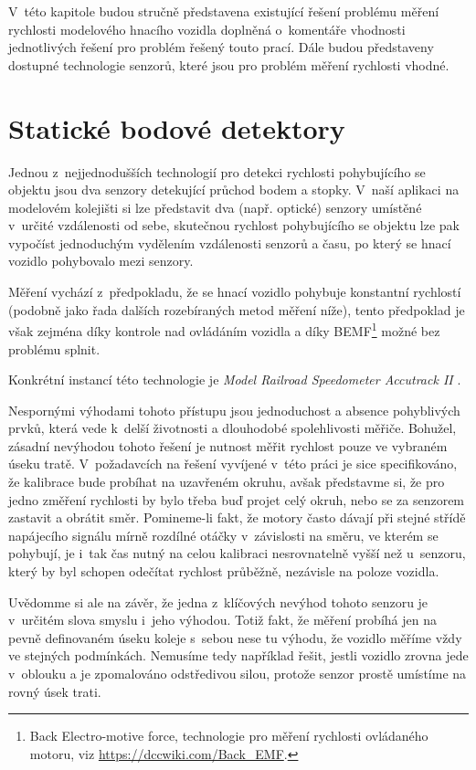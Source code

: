 V~této kapitole budou stručně představena existující řešení problému měření
rychlosti modelového hnacího vozidla doplněná o~komentáře vhodnosti
jednotlivých řešení pro problém řešený touto prací. Dále budou představeny
dostupné technologie senzorů, které jsou pro problém měření rychlosti vhodné.

\section{Statické bodové detektory}

Jednou z~nejjednodušších technologií pro detekci rychlosti pohybujícího se
objektu jsou dva senzory detekující průchod bodem a stopky. V~naší aplikaci na
modelovém kolejišti si lze představit dva (např. optické) senzory umístěné
v~určité vzdálenosti od sebe, skutečnou rychlost pohybujícího se objektu lze
pak vypočíst jednoduchým vydělením vzdálenosti senzorů a času, po který se
hnací vozidlo pohybovalo mezi senzory.

Měření vychází z~předpokladu, že se hnací vozidlo pohybuje konstantní
rychlostí (podobně jako řada dalších rozebíraných metod měření níže), tento
předpoklad je však zejména díky kontrole nad ovládáním vozidla a díky
BEMF\footnote{Back Electro-motive force, technologie pro měření rychlosti
ovládaného motoru, viz \url{https://dccwiki.com/Back\_EMF}.}
možné bez problému splnit.

Konkrétní instancí této technologie je \textit{Model Railroad
Speedometer Accutrack II} \cite{accutrackII}.

Nespornými výhodami tohoto přístupu jsou jednoduchost a absence pohyblivých
prvků, která vede k~delší životnosti a dlouhodobé spolehlivosti měřiče.
Bohužel, zásadní nevýhodou tohoto řešení je nutnost měřit rychlost pouze ve
vybraném úseku tratě. V~požadavcích na řešení vyvíjené v~této práci je sice
specifikováno, že kalibrace bude probíhat na uzavřeném okruhu, avšak představme
si, že pro jedno změření rychlosti by bylo třeba buď projet celý okruh, nebo se
za senzorem zastavit a obrátit směr. Pomineme-li fakt, že motory často dávají
při stejné střídě napájecího signálu mírně rozdílné otáčky v~závislosti na
směru, ve kterém se pohybují, je i~tak čas nutný na celou kalibraci
nesrovnatelně vyšší než u~senzoru, který by byl schopen odečítat rychlost
průběžně, nezávisle na poloze vozidla.

Uvědomme si ale na závěr, že jedna z~klíčových nevýhod tohoto senzoru je
v~určitém slova smyslu i~jeho výhodou. Totiž fakt, že měření probíhá jen na pevně
definovaném úseku koleje s~sebou nese tu výhodu, že vozidlo měříme vždy ve
stejných podmínkách. Nemusíme tedy například řešit, jestli vozidlo zrovna jede
v~oblouku a je zpomalováno odstředivou silou, protože senzor prostě umístíme
na rovný úsek trati.

